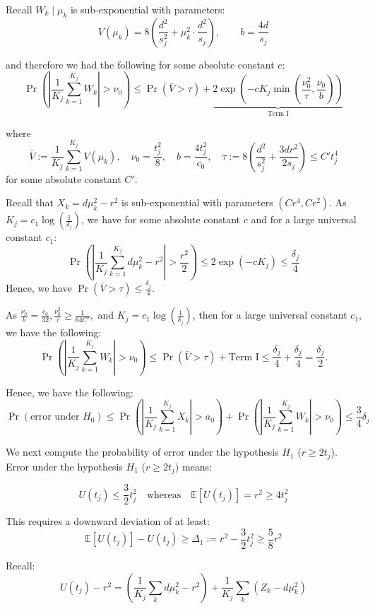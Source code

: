 Recall $W_k \mid \mu_k$ is sub-exponential with parameters:
\[
V(\mu_k) = 8 \left( \frac{d^2}{s_j^2} + \mu_k^2 \cdot \frac{d^2}{s_j} \right), \qquad b = \frac{4d}{s_j}
\]

and therefore we had the following for some absolute constant $c$:
\[
\Pr\left( \left| \frac{1}{K_j} \sum_{k=1}^{K_j} W_k \right| > \nu_0 \right)\leq \Pr(\bar{V}>\tau) + \underbrace{2 \exp\left( -cK_j \min\left( \frac{\nu_0^2}{\tau}, \frac{\nu_0}{b} \right) \right)}_{\text{Term I}}
\]

where 
\[
\bar{V} := \frac{1}{K_j} \sum_{k=1}^{K_j} V(\mu_k),\quad \nu_0 = \frac{t_j^2}{8}, \quad b = \frac{4t_j^2}{c_0}, \quad \tau := 8 \left( \frac{d^2}{s_j^2} + \frac{3dr^2}{2s_j}\right) \leq C't_j^4
\]
for some absolute constant $C'$.

Recall that $X_k = d \mu_k^2 - r^2$ is sub-exponential with parameters $(Cr^4, Cr^2)$. As $K_j = c_1 \log \left( \frac{1}{\delta_j} \right)$, we have for some absolute constant $c$ and for a large universal constant $c_1$:
\[
\Pr\left( \left| \frac{1}{K_j} \sum_{k=1}^{K_j} d \mu_k^2 - r^2 \right| > \frac{r^2}{2} \right) 
\leq 2 \exp(-cK_j) \leq \frac{\delta_j}{4}
\]
Hence, we have $\Pr(\bar{V}>\tau)\leq\frac{\delta_j}{4}$.



As $ \frac{\nu_0}{b}=\frac{c_0}{32}, 
\frac{\nu_0^2}{\tau} \geq\frac{1}{64C'}, $ and $ K_j = c_1 \log \left( \frac{1}{\delta_j} \right)$, then for a large universal constant $c_1$, we have the following:
\[
\Pr\left( \left| \frac{1}{K_j} \sum_{k=1}^{K_j} W_k \right| > \nu_0 \right)\leq \Pr(\bar{V}>\tau) +\text{Term I}\leq \frac{\delta_j}{4}+\frac{\delta_j}{4}=\frac{\delta_j}{2}.
\]

Hence, we have the following:
\[
\Pr(\text{error under } H_0) \leq \Pr\left( \left| \frac{1}{K_j} \sum_{k=1}^{K_j} X_k \right| > a_0 \right)+\Pr\left( \left| \frac{1}{K_j} \sum_{k=1}^{K_j} W_k \right| > \nu_0 \right)\leq \frac{3}{4} \delta_j
\]


We next compute the probability of error under the hypothesis $H_1$ ($r \geq 2t_j$). Error under the hypothesis $H_1$ ($r \geq 2t_j$) means:

\[
U(t_j) \leq \frac{3}{2} t_j^2 
\quad \text{whereas} \quad 
\mathbb{E}[U(t_j)] = r^2 \geq 4t_j^2
\]

This requires a downward deviation of at least:
\[
\mathbb{E}[U(t_j)] - U(t_j) \geq \Delta_1 := r^2 - \frac{3}{2} t_j^2 \geq \frac{5}{8} r^2
\]

Recall:
\[
U(t_j) - r^2 = \left( \frac{1}{K_j} \sum_k d\mu_k^2 - r^2 \right) + \frac{1}{K_j} \sum_k (Z_k - d\mu_k^2)
\]


